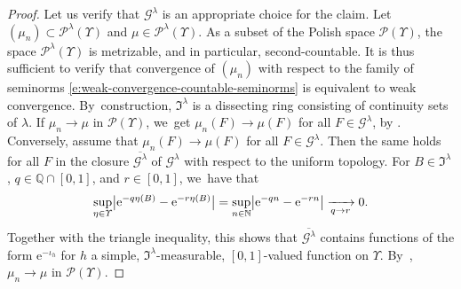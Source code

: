 \documentclass[JEP,XML,SOM,Unicode,published]{cedram}
\theoremstyle{definition}
\theoremstyle{remark}
\DeclarePairedDelimiter{\abs}{\lvert}{\rvert}
\begin{document}
\begin{proof}
Let us verify that $\mathscr{G}^{\lambda}$ is an appropriate choice for the claim.
Let $(\mu_{n}) \subset \mathscr{P}^{\lambda}(\varUpsilon)$ and $\mu \in \mathscr{P}^{\lambda}(\varUpsilon)$.
As a subset of the Polish space $\mathscr{P}(\varUpsilon)$, the space $\mathscr{P}^{\lambda}(\varUpsilon)$ is metrizable, and in particular, second-countable.
It is thus sufficient to verify that convergence of $(\mu_{n})$ with respect to the family of seminorms \cref{e:weak-convergence-countable-seminorms} is equivalent to weak convergence.
By~construction, $\mathfrak{I}^{\lambda}$ is a dissecting ring consisting of continuity sets of $\lambda$.
If $\mu_{n} \to \mu$ in $\mathscr{P}(\varUpsilon)$, we~get $\mu_{n}(F) \to \mu(F)$ for all $F \in \mathscr{G}^{\lambda}$, by \cite[Th.\,4.11(iii)]{Kallenberg}.
Conversely, assume that $\mu_{n}(F) \to \mu(F)$ for all $F \in \mathscr{G}^{\lambda}$.
Then the same holds for all $F$ in the closure $\overline{\mathscr{G}^{\lambda}}$ of $\mathscr{G}^{\lambda}$ with respect to the uniform topology.
For $B \in \mathfrak{I}^{\lambda}$, $q \in \mathbb{Q} \cap [0,1]$, and $r \in [0,1]$, we~have that
\begin{equation*}
\sup_{\eta \in \varUpsilon} \abs[\big]{\mathrm{e}^{-q \eta(B)} - \mathrm{e}^{-r \eta(B)}} = \sup_{n \in \mathbb{N}} \abs[\big]{\mathrm{e}^{-qn} - \mathrm{e}^{-rn}} \xrightarrow[q \to r]{} 0.
\end{equation*}
Together with the triangle inequality, this shows that $\overline{\mathscr{G}^{\lambda}}$ contains functions of the form $\mathrm{e}^{-\iota_{h}}$ for $h$ a simple, $\mathfrak{I}^{\lambda}$-measurable, $[0,1]$-valued function on $\varUpsilon$.
By~\cite[Th.\,4.11]{Kallenberg}, $\mu_{n} \to \mu$ in $\mathscr{P}(\varUpsilon)$.
\end{proof}
\end{document}
